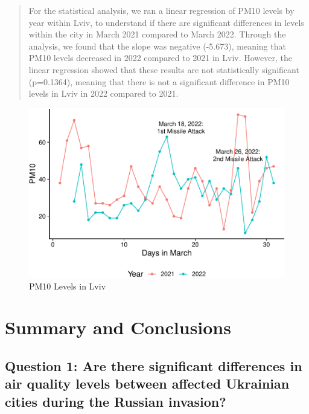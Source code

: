 \documentclass[
  12pt,
]{article}
\begin{document}
\begin{quote}
For the statistical analysis, we ran a linear regression of PM10 levels
by year within Lviv, to understand if there are significant differences
in levels within the city in March 2021 compared to March 2022. Through
the analysis, we found that the slope was negative (-5.673), meaning
that PM10 levels decreased in 2022 compared to 2021 in Lviv. However,
the linear regression showed that these results are not statistically
significant (p=0.1364), meaning that there is not a significant
difference in PM10 levels in Lviv in 2022 compared to 2021.
\end{quote}

\begin{figure}
\centering
\includegraphics{Fontanie_Gordon_Weinberg_Project_files/figure-latex/visualizing PM10 in Lviv-1.pdf}
\caption{PM10 Levels in Lviv}
\end{figure}

\newpage

\hypertarget{summary-and-conclusions}{%
\section{Summary and Conclusions}\label{summary-and-conclusions}}

\hypertarget{question-1-are-there-significant-differences-in-air-quality-levels-between-affected-ukrainian-cities-during-the-russian-invasion-1}{%
\subsection{Question 1: Are there significant differences in air quality
levels between affected Ukrainian cities during the Russian
invasion?}\label{question-1-are-there-significant-differences-in-air-quality-levels-between-affected-ukrainian-cities-during-the-russian-invasion-1}}
\end{document}

